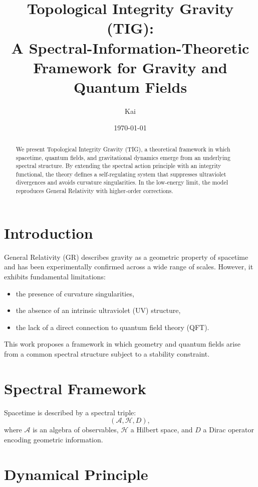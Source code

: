 \documentclass[11pt,a4paper]{article}
\title{\textbf{Topological Integrity Gravity (TIG):\\
A Spectral-Information-Theoretic Framework for Gravity and Quantum Fields}}
\author{Kai}
\date{\today}
\begin{document}
\maketitle

\begin{abstract}
We present Topological Integrity Gravity (TIG), a theoretical framework in which spacetime, quantum fields, and gravitational dynamics emerge from an underlying spectral structure. By extending the spectral action principle with an integrity functional, the theory defines a self-regulating system that suppresses ultraviolet divergences and avoids curvature singularities. In the low-energy limit, the model reproduces General Relativity with higher-order corrections.
\end{abstract}

\section{Introduction}

General Relativity (GR) describes gravity as a geometric property of spacetime and has been experimentally confirmed across a wide range of scales. However, it exhibits fundamental limitations:

\begin{itemize}
\item the presence of curvature singularities,
\item the absence of an intrinsic ultraviolet (UV) structure,
\item the lack of a direct connection to quantum field theory (QFT).
\end{itemize}

This work proposes a framework in which geometry and quantum fields arise from a common spectral structure subject to a stability constraint.

\section{Spectral Framework}

Spacetime is described by a spectral triple:
\begin{equation}
(\mathcal{A}, \mathcal{H}, D),
\end{equation}
where $\mathcal{A}$ is an algebra of observables, $\mathcal{H}$ a Hilbert space, and $D$ a Dirac operator encoding geometric information.

\section{Dynamical Principle}
\end{document}
